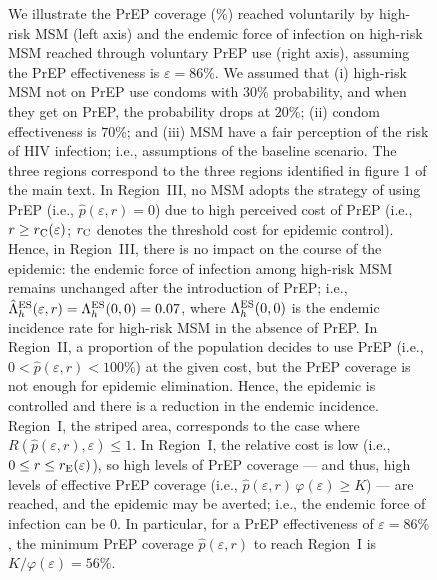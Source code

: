 \documentclass[12pt]{article}
\begin{document}
\begin{figure}[H]
{We illustrate the PrEP coverage ($\%$) reached voluntarily by high-risk MSM (left axis) and the endemic force of infection on high-risk MSM reached through voluntary PrEP use (right axis), assuming the PrEP effectiveness is $\varepsilon=86\%$. We assumed that (i) high-risk MSM not on PrEP use condoms with $30\%$ probability, and when they get on PrEP, the probability drops at $20\%$; (ii) condom effectiveness is $70\%$; and (iii) MSM have a fair perception of the risk of HIV infection; i.e., assumptions of the baseline scenario. The three regions correspond to the three regions identified in figure 1 of the main text. In Region~III, no MSM adopts the strategy of using PrEP (i.e., $\hat{p}(\varepsilon,r)=0$) due to high perceived cost of PrEP (i.e., $r \geq r_{\rm C}(\varepsilon)$; $r_{\rm C}$ denotes the threshold cost for epidemic control). Hence, in Region~III, there is no impact on the course of the epidemic: the endemic force of infection among high-risk MSM remains unchanged after the introduction of PrEP; i.e., $\hat{\Lambda}_h^{\rm ES}(\varepsilon, r) = \Lambda_h^{\rm ES}(0,0) = 0.07$, where $\Lambda_h^{\rm ES}(0,0)$ is the endemic incidence rate for high-risk MSM in the absence of PrEP. In Region~II,  a proportion of the population decides to use PrEP (i.e., $0<\hat{p}(\varepsilon,r) <100\%$) at the given cost, but the PrEP coverage is not enough for epidemic elimination. Hence, the epidemic is controlled and there is a reduction in the endemic incidence. Region~I, the striped area, corresponds to the case where $R\left(\hat{p}(\varepsilon,r),\varepsilon\right) \leq 1$. In Region~I, the relative cost is low (i.e., $0 \leq r \leq r_{\rm E} (\varepsilon)$), so high levels of PrEP coverage --- and thus, high levels of effective PrEP coverage (i.e., $\hat{p}(\varepsilon,r) \,\varphi(\varepsilon) \geq K$) --- are reached, and the epidemic may be averted; i.e., the endemic force of infection can be 0. In particular, for a PrEP effectiveness of $\varepsilon=86\%$, the minimum PrEP coverage $\hat{p}(\varepsilon,r)$ to reach Region~I is $K/\varphi(\varepsilon) = 56\%$.}	\label{fig:p_hat_086}
\end{figure}

\end{document}
